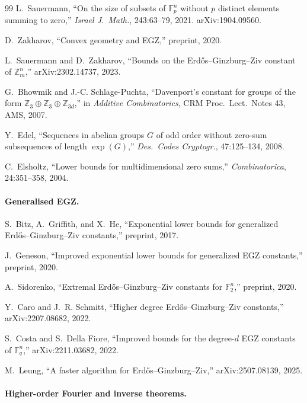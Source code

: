 \documentclass[11pt,a4paper]{article}
\theoremstyle{plain}
\theoremstyle{definition}
\theoremstyle{remark}
\newcommand{\F}{\mathbb{F}}
\newcommand{\Z}{\mathbb{Z}}
\begin{document}
\begin{thebibliography}{99}
L.~Sauermann, ``On the size of subsets of $\F_p^n$ without $p$ distinct elements summing to zero,'' \emph{Israel J.\ Math.}, 243:63--79, 2021. arXiv:1904.09560.

D.~Zakharov, ``Convex geometry and EGZ,'' preprint, 2020.

L.~Sauermann and D.~Zakharov, ``Bounds on the Erd\H{o}s--Ginzburg--Ziv constant of $\Z_m^n$,'' arXiv:2302.14737, 2023.

G.~Bhowmik and J.-C. Schlage-Puchta, ``Davenport's constant for groups of the form $\Z_3 \oplus \Z_3 \oplus \Z_{3d}$,'' in \emph{Additive Combinatorics}, CRM Proc.\ Lect.\ Notes 43, AMS, 2007.

Y.~Edel, ``Sequences in abelian groups $G$ of odd order without zero-sum subsequences of length $\exp(G)$,'' \emph{Des.\ Codes Cryptogr.}, 47:125--134, 2008.

C.~Elsholtz, ``Lower bounds for multidimensional zero sums,'' \emph{Combinatorica}, 24:351--358, 2004.

\paragraph{Generalised EGZ.}

S.~Bitz, A.~Griffith, and X.~He, ``Exponential lower bounds for generalized Erd\H{o}s--Ginzburg--Ziv constants,'' preprint, 2017.

J.~Geneson, ``Improved exponential lower bounds for generalized EGZ constants,'' preprint, 2020.

A.~Sidorenko, ``Extremal Erd\H{o}s--Ginzburg--Ziv constants for $\F_2^n$,'' preprint, 2020.

Y.~Caro and J.~R. Schmitt, ``Higher degree Erd\H{o}s--Ginzburg--Ziv constants,'' arXiv:2207.08682, 2022.

S.~Costa and S.~Della Fiore, ``Improved bounds for the degree-$d$ EGZ constants of $\F_q^n$,'' arXiv:2211.03682, 2022.

M.~Leung, ``A faster algorithm for Erd\H{o}s--Ginzburg--Ziv,'' arXiv:2507.08139, 2025.

\paragraph{Higher-order Fourier and inverse theorems.}


\end{thebibliography}
\end{document}
